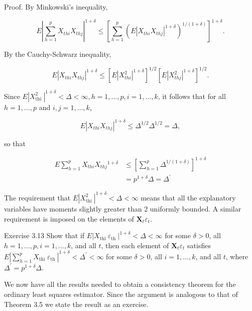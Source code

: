 \documentclass[10pt]{article}
\begin{document}
Proof. By Minkowski's inequality,

$$
E\left|\sum_{h=1}^{p} X_{t h i} X_{t h j}\right|^{1+\delta} \leq\left[\sum_{h=1}^{p}\left(E\left|X_{t h i} X_{t h j}\right|^{1+\delta}\right)^{1 /(1+\delta)}\right]^{1+\delta} .
$$

By the Cauchy-Schwarz inequality,

$$
E\left|X_{t h i} X_{t h j}\right|^{1+\delta} \leq\left[E\left|X_{t h i}^{2}\right|^{1+\delta}\right]^{1 / 2}\left[E\left|X_{t h j}^{2}\right|^{1+\delta}\right]^{1 / 2} .
$$

Since $E\left|X_{\text {thi }}^{2}\right|^{1+\delta}<\Delta<\infty, h=1, \ldots, p, i=1, \ldots, k$, it follows that for all $h=1, \ldots, p$ and $i, j=1, \ldots, k$,

$$
E\left|X_{t h i} X_{t h j}\right|^{1+\delta} \leq \Delta^{1 / 2} \Delta^{1 / 2}=\Delta,
$$

so that

$$
\begin{aligned}
E \sum_{h=1}^{p} X_{t h i} X_{t h j}{ }^{1+\delta} & \leq\left[\sum_{h=1}^{p} \Delta^{1 /(1+\delta)}\right]^{1+\delta} \\
& =p^{1+\delta} \Delta=\Delta^{\prime}
\end{aligned}
$$

The requirement that $E\left|X_{\text {thi }}^{2}\right|^{1+\delta}<\Delta<\infty$ means that all the explanatory variables have moments slightly greater than 2 uniformly bounded. A similar requirement is imposed on the elements of $\mathbf{X}_{t} \varepsilon_{t}$.

Exercise 3.13 Show that if $E\left|X_{\text {thi }} \varepsilon_{\text {th }}\right|^{1+\delta}<\Delta<\infty$ for some $\delta>0$, all $h=1, \ldots, p, i=1, \ldots, k$, and all $t$, then each element of $\mathbf{X}_{t} \varepsilon_{t}$ satisfies $E\left|\sum_{h=1}^{p} X_{\text {thi }} \varepsilon_{\text {th }}\right|^{1+\delta}<\Delta^{\prime}<\infty$ for some $\delta>0$, all $i=1, \ldots, k$, and all $t$, where $\Delta^{\prime}=p^{1+\delta} \Delta$.

We now have all the results needed to obtain a consistency theorem for the ordinary least squares estimator. Since the argument is analogous to that of Theorem 3.5 we state the result as an exercise.
\end{document}
